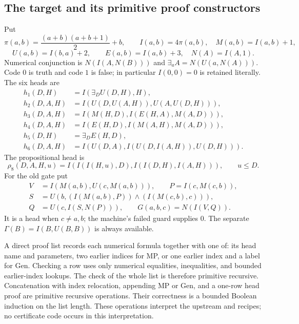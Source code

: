 \subsection{The target and its primitive proof constructors}

Put
\[
 \pi(a,b)=\frac{(a+b)(a+b+1)}2+b,\qquad
 I(a,b)=4\pi(a,b),\quad M(a,b)=I(a,b)+1,
\]
\[
 U(a,b)=I(b,a)+2,\qquad E(a,b)=I(a,b)+3,
 \quad N(A)=I(A,1).
\]
Numerical conjunction is $N(I(A,N(B)))$ and
$\exists_a A=N(U(a,N(A)))$.  Code $0$ is truth and code $1$ is false;
in particular $I(0,0)=0$ is retained literally.  The six heads are
\begin{align*}
 h_1(D,H)&=I(\exists_D U(D,H),H),\\
 h_2(D,A,H)&=I(U(D,U(A,H)),U(A,U(D,H))),\\
 h_3(D,A,H)&=I(M(H,D),I(E(H,A),M(A,D))),\\
 h_4(D,A,H)&=I(E(H,D),I(M(A,H),M(A,D))),\\
 h_5(D,H)&=\exists_D E(H,D),\\
 h_6(D,A,H)&=I(U(D,A),I(U(D,I(A,H)),U(D,H))).
\end{align*}
The propositional head is
\[
 \rho _8(D,A,H,u)=I(I(I(H,u),D),I(I(D,H),I(A,H))),
 \qquad u\le D.
\]
For the old gate put
\[
 \begin{split}
 V&=I(M(a,b),U(c,M(a,b))),\qquad P=I(c,M(c,b)),\\
 S&=U(b,(I(M(a,b),P))\mathbin\wedge(I(M(c,b),c))),\\
 Q&=U(c,I(S,N(P))),\qquad G(a,b,c)=N(I(V,Q)).
 \end{split}
\]
It is a head when $c\ne a,b$; the machine's failed guard supplies
$0$.  The separate $\Gamma(B)=I(B,U(B,B))$ is always available.

A direct proof list records each numerical formula together with one
of: its head name and parameters, two earlier indices for MP, or one
earlier index and a label for Gen.  Checking a row uses only numerical
equalities, inequalities, and bounded earlier-index lookups.  The check
of the whole list is therefore primitive recursive.  Concatenation
with index relocation, appending MP or Gen, and a one-row head proof
are primitive recursive operations.  Their correctness is a bounded
Boolean induction on the list length.  These operations interpret the
upstream  and  recipes; no
 certificate code occurs in this interpretation.

